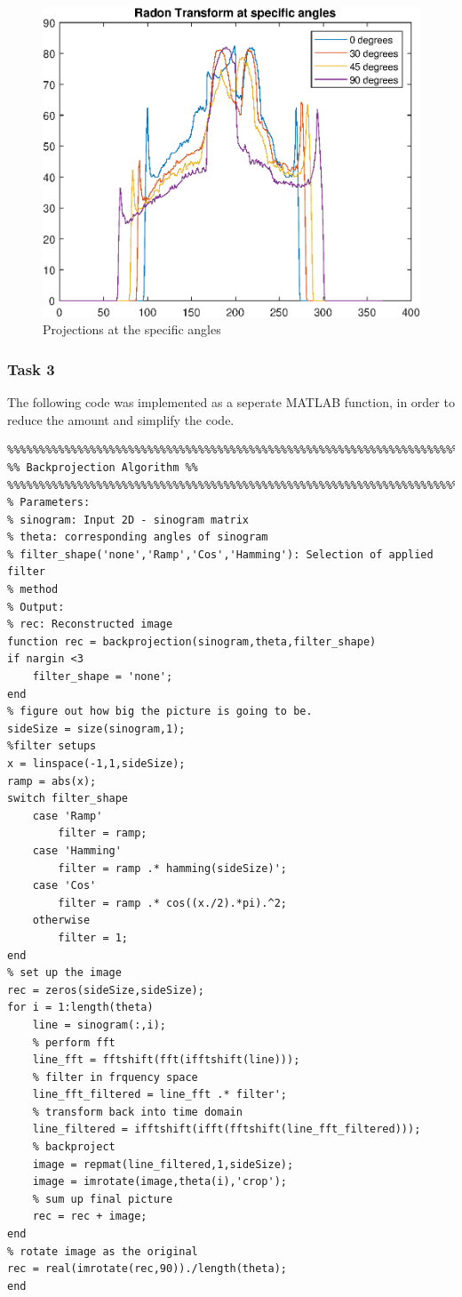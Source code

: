 \begin{figure}[htb!]
    \centering
    \includegraphics[width=.6\linewidth]{homework1/img/9.eps}
    \caption{Projections at the specific angles}
    \label{fig:sinogram:spec_angles}
\end{figure}

\clearpage
\newpage

\subsubsection*{Task 3}

The following code was implemented as a seperate MATLAB function, in order to reduce the amount and simplify the code.

\begin{lstlisting}
%%%%%%%%%%%%%%%%%%%%%%%%%%%%%%%%%%%%%%%%%%%%%%%%%%%%%%%%%%%%%%%%%%%%%%%%%%%
%% Backprojection Algorithm %%
%%%%%%%%%%%%%%%%%%%%%%%%%%%%%%%%%%%%%%%%%%%%%%%%%%%%%%%%%%%%%%%%%%%%%%%%%%%
% Parameters: 
% sinogram: Input 2D - sinogram matrix
% theta: corresponding angles of sinogram
% filter_shape('none','Ramp','Cos','Hamming'): Selection of applied filter
% method
% Output: 
% rec: Reconstructed image
function rec = backprojection(sinogram,theta,filter_shape)
if nargin <3
    filter_shape = 'none';
end
% figure out how big the picture is going to be.
sideSize = size(sinogram,1); 
%filter setups
x = linspace(-1,1,sideSize);
ramp = abs(x);
switch filter_shape
    case 'Ramp'
        filter = ramp;
    case 'Hamming'
        filter = ramp .* hamming(sideSize)';
    case 'Cos'
        filter = ramp .* cos((x./2).*pi).^2;
    otherwise
        filter = 1;
end
% set up the image
rec = zeros(sideSize,sideSize);
for i = 1:length(theta)    
    line = sinogram(:,i);    
    % perform fft
    line_fft = fftshift(fft(ifftshift(line)));        
    % filter in frquency space
    line_fft_filtered = line_fft .* filter';    
    % transform back into time domain
    line_filtered = ifftshift(ifft(fftshift(line_fft_filtered)));    
    % backproject
    image = repmat(line_filtered,1,sideSize);
    image = imrotate(image,theta(i),'crop');    
    % sum up final picture
    rec = rec + image;
end
% rotate image as the original
rec = real(imrotate(rec,90))./length(theta);
end
\end{lstlisting}


